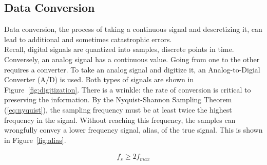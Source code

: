 \documentclass[]{article}
\begin{document}
\subsection{Data Conversion}
\label{app:converter}
Data conversion, the process of taking a continuous signal and descretizing it, can lead to additional and sometimes catastrophic errors.\\

Recall, digital signals are quantized into samples, discrete points in time.  Conversely, an analog signal has a continuous value.  Going from one to the other requires a converter.  To take an analog signal and digitize it, an Analog-to-Digial Converter (A/D) is used.  Both types of signals are shown in Figure~\ref{fig:digitization}.  There is a wrinkle: the rate of conversion is critical to preserving the information.  By the Nyquist-Shannon Sampling Theorem (\ref{eq:nyquist}), the sampling frequency must be at least twice the highest frequency in the signal.  Without reaching this frequency, the samples can wrongfully convey a lower frequency signal, alias, of the true signal.  This is shown in Figure~\ref{fig:alias}.  

\begin{align}
\label{eq:nyquist}
f_s \geq 2 f_{max}
\end{align}
\end{document}

